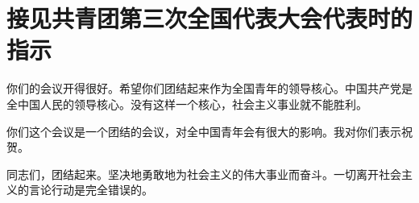 \section[接见共青团第三次全国代表大会代表时的指示（一九五七年五月二十五日）]{接见共青团第三次全国代表大会代表时的指示}


你们的会议开得很好。希望你们团结起来作为全国青年的领导核心。中国共产党是全中国人民的领导核心。没有这样一个核心，社会主义事业就不能胜利。

你们这个会议是一个团结的会议，对全中国青年会有很大的影响。我对你们表示祝贺。

同志们，团结起来。坚决地勇敢地为社会主义的伟大事业而奋斗。一切离开社会主义的言论行动是完全错误的。


